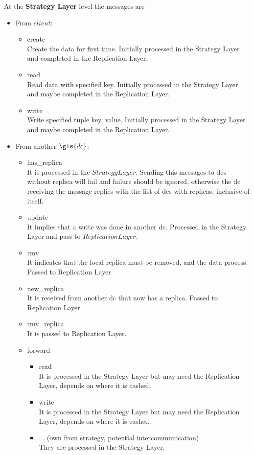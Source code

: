 \documentclass[english]{article}
\begin{document}
At the {\bf Strategy Layer} level the messages are
\begin{itemize}
	\item From $client$:
		\begin{itemize}
			\item \textcolor{msgTxt}{create}\\
				Create the data for first time. Initially processed in the Strategy Layer and completed in the Replication Layer.
			\item \textcolor{msgTxt}{read}\\
				Read data with specified key. Initially processed in the Strategy Layer and maybe completed in the Replication Layer.
			\item \textcolor{msgTxt}{write}\\
				Write specified tuple key, value. Initially processed in the Strategy Layer and maybe completed in the Replication Layer.
		\end{itemize}

	\item From another  $\gls{dc}$:
		\begin{itemize}
			\item \textcolor{msgTxt}{has\_replica}\\
				It is processed in the $Strategy Layer$. Sending this messages to \glspl{dc} without replica will fail and failure should be ignored, otherwise the \gls{dc} receiving the message replies with the list of \glspl{dc} with replicas, inclusive of itself.
			\item \textcolor{msgTxt}{update}\\
				It implies that a write was done in another \gls{dc}. Processed in the Strategy Layer and pass to $Replication Layer$.
			\item \textcolor{msgTxt}{rmv}\\
				It indicates that the local replica must be removed, and the data process. Passed to Replication Layer.
			\item \textcolor{msgTxt}{new\_replica}\\
				It is received from another \gls{dc} that now has a replica. Passed to Replication Layer.
			\item \textcolor{msgTxt}{rmv\_replica}\\
				It is passed to Replication Layer.
			\item \textcolor{msgTxt}{forward}
				\begin{itemize}
					\item \textcolor{msgTxt}{read}\\
						It is processed in the Strategy Layer but may need the Replication Layer, depends on where it is cashed.
					\item \textcolor{msgTxt}{write}\\
						It is processed in the Strategy Layer but may need the Replication Layer, depends on where it is cashed.
					\item $\dots$ (own from strategy, potential intercommunication)\\
						They are processed in the Strategy Layer.
				\end{itemize}
		\end{itemize}
\end{itemize}
\end{document}
